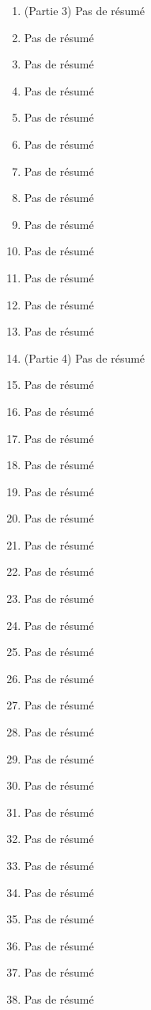 \documentclass{article}
\begin{document}
\begin{enumerate}
    \item (Partie 3) Pas de résumé
    \item Pas de résumé
    \item Pas de résumé
    \item Pas de résumé
    \item Pas de résumé
    \item Pas de résumé
    \item Pas de résumé
    \item Pas de résumé
    \item Pas de résumé
    \item Pas de résumé
    \item Pas de résumé
    \item Pas de résumé
    \item Pas de résumé
    \item (Partie 4) Pas de résumé
    \item Pas de résumé
    \item Pas de résumé
    \item Pas de résumé
    \item Pas de résumé
    \item Pas de résumé
    \item Pas de résumé
    \item Pas de résumé
    \item Pas de résumé
    \item Pas de résumé
    \item Pas de résumé
    \item Pas de résumé
    \item Pas de résumé
    \item Pas de résumé
    \item Pas de résumé
    \item Pas de résumé
    \item Pas de résumé
    \item Pas de résumé
    \item Pas de résumé
    \item Pas de résumé
    \item Pas de résumé
    \item Pas de résumé
    \item Pas de résumé
    \item Pas de résumé
    \item Pas de résumé
\end{enumerate}
\end{document}
